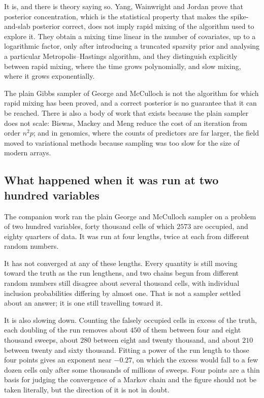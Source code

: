 It is, and there is theory saying so. Yang, Wainwright and Jordan \cite{yang2016}
prove that posterior concentration, which is the statistical property that makes the
spike-and-slab posterior correct, does not imply rapid mixing of the algorithm used
to explore it. They obtain a mixing time linear in the number of covariates, up to a
logarithmic factor, only after introducing a truncated sparsity prior and analysing a
particular Metropolis--Hastings algorithm, and they distinguish explicitly between
rapid mixing, where the time grows polynomially, and slow mixing, where it grows
exponentially.

The plain Gibbs sampler of George and McCulloch is not the algorithm for which rapid
mixing has been proved, and a correct posterior is no guarantee that it can be
reached. There is also a body of work that exists because the plain sampler does not
scale: Biswas, Mackey and Meng \cite{biswas2022} reduce the cost of an iteration from
order $n^{2} p$; and in genomics, where the counts of predictors are far larger, the
field moved to variational methods because sampling was too slow for the size of
modern arrays.

\subsection{What happened when it was run at two hundred variables}
\label{sec:mixingevidence}

The companion work ran the plain George and McCulloch sampler on a problem of two
hundred variables, forty thousand cells of which $2573$ are occupied, and eighty
quarters of data. It was run at four lengths, twice at each from different random
numbers.



It has not converged at any of these lengths. Every quantity is still moving toward
the truth as the run lengthens, and two chains begun from different random numbers
still disagree about several thousand cells, with individual inclusion probabilities
differing by almost one. That is not a sampler settled about an answer; it is one
still travelling toward it.

It is also slowing down. Counting the falsely occupied cells in excess of the truth,
each doubling of the run removes about $450$ of them between four and eight thousand
sweeps, about $280$ between eight and twenty thousand, and about $210$ between twenty
and sixty thousand. Fitting a power of the run length to those four points gives an
exponent near $-0.27$, on which the excess would fall to a few dozen cells only after
some thousands of millions of sweeps. Four points are a thin basis for judging the
convergence of a Markov chain and the figure should not be taken literally, but the
direction of it is not in doubt.

